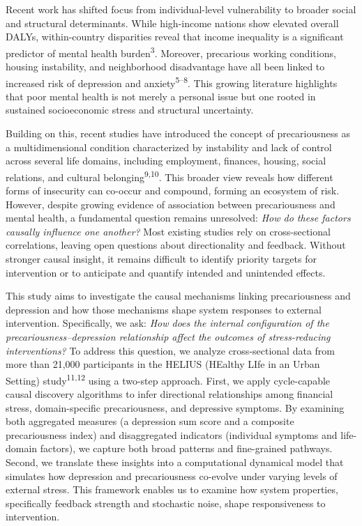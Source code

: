 \documentclass[
]{article}
\begin{document}
Recent work has shifted focus from individual-level vulnerability to
broader social and structural determinants. While high-income nations
show elevated overall DALYs, within-country disparities reveal that
income inequality is a significant predictor of mental health
burden\textsuperscript{3}. Moreover, precarious working conditions,
housing instability, and neighborhood disadvantage have all been linked
to increased risk of depression and anxiety\textsuperscript{5--8}. This
growing literature highlights that poor mental health is not merely a
personal issue but one rooted in sustained socioeconomic stress and
structural uncertainty.

Building on this, recent studies have introduced the concept of
precariousness as a multidimensional condition characterized by
instability and lack of control across several life domains, including
employment, finances, housing, social relations, and cultural
belonging\textsuperscript{9,10}. This broader view reveals how different
forms of insecurity can co-occur and compound, forming an ecosystem of
risk. However, despite growing evidence of association between
precariousness and mental health, a fundamental question remains
unresolved: \emph{How do these factors causally influence one another?}
Most existing studies rely on cross-sectional correlations, leaving open
questions about directionality and feedback. Without stronger causal
insight, it remains difficult to identify priority targets for
intervention or to anticipate and quantify intended and unintended
effects.

This study aims to investigate the causal mechanisms linking
precariousness and depression and how those mechanisms shape system
responses to external intervention. Specifically, we ask: \emph{How does
the internal configuration of the precariousness--depression
relationship affect the outcomes of stress-reducing interventions?} To
address this question, we analyze cross-sectional data from more than
21,000 participants in the HELIUS (HEalthy LIfe in an Urban Setting)
study\textsuperscript{11,12} using a two-step approach. First, we apply
cycle-capable causal discovery algorithms to infer directional
relationships among financial stress, domain-specific precariousness,
and depressive symptoms. By examining both aggregated measures (a
depression sum score and a composite precariousness index) and
disaggregated indicators (individual symptoms and life-domain factors),
we capture both broad patterns and fine-grained pathways. Second, we
translate these insights into a computational dynamical model that
simulates how depression and precariousness co-evolve under varying
levels of external stress. This framework enables us to examine how
system properties, specifically feedback strength and stochastic noise,
shape responsiveness to intervention.
\end{document}
